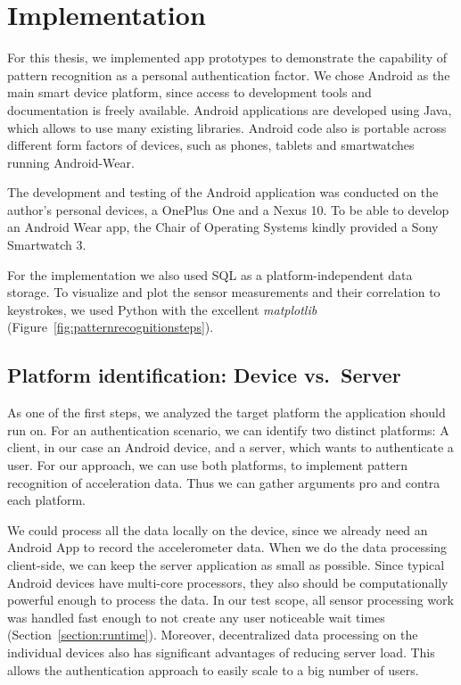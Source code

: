 \chapter{Implementation}\label{chapter:implementation}
For this thesis, we implemented app prototypes to demonstrate the capability of pattern recognition as a personal authentication factor. We chose Android as the main smart device platform, since access to development tools and documentation is freely available. Android applications are developed using Java, which allows to use many existing libraries. Android code also is portable across different form factors of devices, such as phones, tablets and smartwatches running Android-Wear.

The development and testing of the Android application was conducted on the author's personal devices, a OnePlus One and a Nexus 10. To be able to develop an Android Wear app, the Chair of Operating Systems kindly provided a Sony Smartwatch 3.

For the implementation we also used SQL as a platform-independent data storage. To visualize and plot the sensor measurements and their correlation to keystrokes, we used Python with the excellent \emph{matplotlib} (\cf Figure~\ref{fig:patternrecognitionsteps}).

\section{Platform identification: Device vs.\ Server}
As one of the first steps, we analyzed the target platform the application should run on. For an authentication scenario, we can identify two distinct platforms: A client, in our case an Android device, and a server, which wants to authenticate a user. For our approach, we can use both platforms, to implement pattern recognition of acceleration data. Thus we can gather arguments pro and contra each platform.

We could process all the data locally on the device, since we already need an Android App to record the accelerometer data. When we do the data processing client-side, we can keep the server application as small as possible. Since typical Android devices have multi-core processors, they also should be computationally powerful enough to process the data. In our test scope, all sensor processing work was handled fast enough to not create any user noticeable wait times (\cf Section~\ref{section:runtime}). Moreover, decentralized data processing on the individual devices also has significant advantages of reducing server load. This allows the authentication approach to easily scale to a big number of users.

